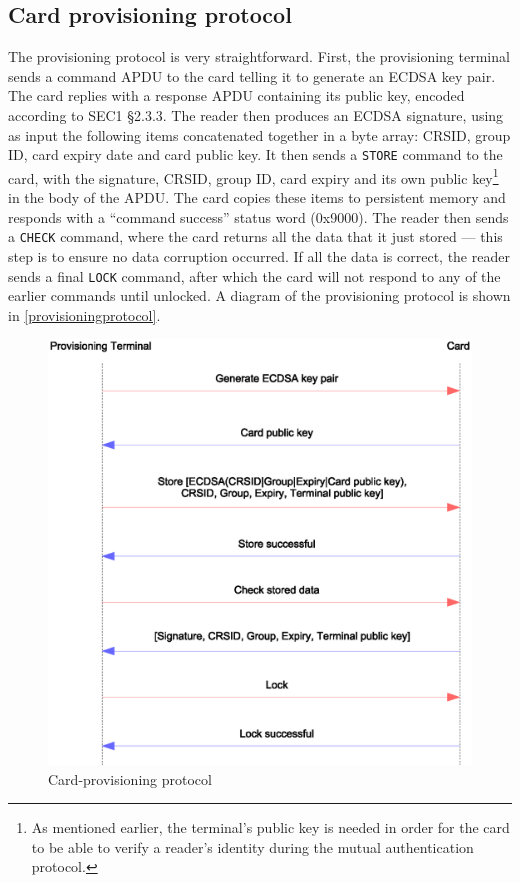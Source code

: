 \documentclass[12pt,a4paper,twoside,openright]{report}
\begin{document}
\subsection{Card provisioning protocol}

The provisioning protocol is very straightforward. First, the provisioning terminal sends a command APDU to the card telling it to generate an ECDSA key pair. The card replies with a response APDU containing its public key, encoded according to SEC1 \cite{sec1} \S2.3.3. The reader then produces an ECDSA signature, using as input the following items concatenated together in a byte array: CRSID, group ID, card expiry date and card public key. It then sends a \texttt{STORE} command to the card, with the signature, CRSID, group ID, card expiry and its own public key\footnote{As mentioned earlier, the terminal's public key is needed in order for the card to be able to verify a reader's identity during the mutual authentication protocol.} in the body of the APDU. The card copies these items to persistent memory and responds with a ``command success'' status word (0x9000). The reader then sends a \texttt{CHECK} command, where the card returns all the data that it just stored --- this step is to ensure no data corruption occurred. If all the data is correct, the reader sends a final \texttt{LOCK} command, after which the card will not respond to any of the earlier commands until unlocked. A diagram of the provisioning protocol is shown in \autoref{provisioningprotocol}.

\begin{figure}[tbh]
\centerline{\includegraphics[scale=0.8]{figures/provisioningprotocol.eps}}
\caption{Card-provisioning protocol}
\label{provisioningprotocol}
\end{figure}
\end{document}
